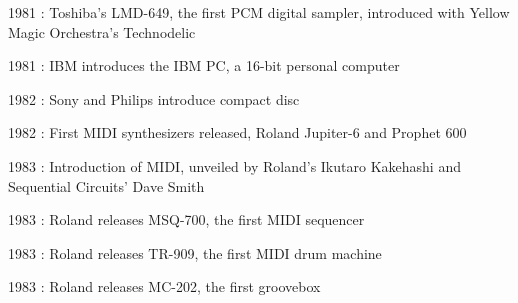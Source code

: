 \documentclass[12pt]{report}
\begin{document}
\begin{adjustwidth}{0.5in}{0.0in}
1981 : Toshiba's LMD-649, the first PCM digital sampler, introduced with Yellow Magic Orchestra's Technodelic\par

\end{adjustwidth}

\begin{adjustwidth}{0.5in}{0.0in}
1981 : IBM introduces the IBM PC, a 16-bit personal computer\par

\end{adjustwidth}

\begin{adjustwidth}{0.5in}{0.0in}
1982 : Sony and Philips introduce compact disc\par

\end{adjustwidth}

\begin{adjustwidth}{0.5in}{0.0in}
1982 : First MIDI synthesizers released, Roland Jupiter-6 and Prophet 600\par

\end{adjustwidth}

\begin{adjustwidth}{0.5in}{0.0in}
1983 : Introduction of MIDI, unveiled by Roland's Ikutaro Kakehashi and Sequential Circuits' Dave Smith\par

\end{adjustwidth}

\begin{adjustwidth}{0.5in}{0.0in}
1983 : Roland releases MSQ-700, the first MIDI sequencer\par

\end{adjustwidth}

\begin{adjustwidth}{0.5in}{0.0in}
1983 : Roland releases TR-909, the first MIDI drum machine\par

\end{adjustwidth}

\begin{adjustwidth}{0.5in}{0.0in}
1983 : Roland releases MC-202, the first groovebox\par

\end{adjustwidth}
\end{document}
